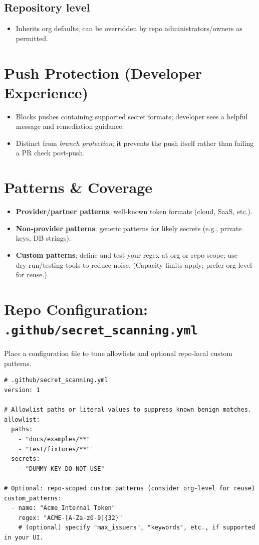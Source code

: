 \documentclass[11pt,a4paper]{article}
\newcommand{\kpi}[1]{\textbf{\textsf{#1}}}
\begin{document}
\subsection*{Repository level}
\begin{itemize}
  \item Inherits org defaults; can be overridden by repo administrators/owners as permitted.
\end{itemize}

\section{Push Protection (Developer Experience)}
\begin{itemize}
  \item Blocks pushes containing supported secret formats; developer sees a helpful message and remediation guidance.
  \item Distinct from \textit{branch protection}; it prevents the push itself rather than failing a PR check post‑push.
\end{itemize}

\section{Patterns \& Coverage}
\begin{itemize}
  \item \kpi{Provider/partner patterns}: well‑known token formats (cloud, SaaS, etc.).
  \item \kpi{Non‑provider patterns}: generic patterns for likely secrets (e.g., private keys, DB strings).
  \item \kpi{Custom patterns}: define and test your regex at org or repo scope; use dry‑run/testing tools to reduce noise. (Capacity limits apply; prefer org‑level for reuse.)
\end{itemize}
\clearpage

\section{Repo Configuration: \texttt{.github/secret\_scanning.yml}}
Place a configuration file to tune allowlists and optional repo‑local custom patterns.

\begin{verbatim}
# .github/secret_scanning.yml
version: 1

# Allowlist paths or literal values to suppress known benign matches.
allowlist:
  paths:
    - "docs/examples/**"
    - "test/fixtures/**"
  secrets:
    - "DUMMY-KEY-DO-NOT-USE"

# Optional: repo-scoped custom patterns (consider org-level for reuse)
custom_patterns:
  - name: "Acme Internal Token"
    regex: "ACME-[A-Za-z0-9]{32}"
    # (optional) specify "max_issuers", "keywords", etc., if supported in your UI.
\end{verbatim}
\end{document}
